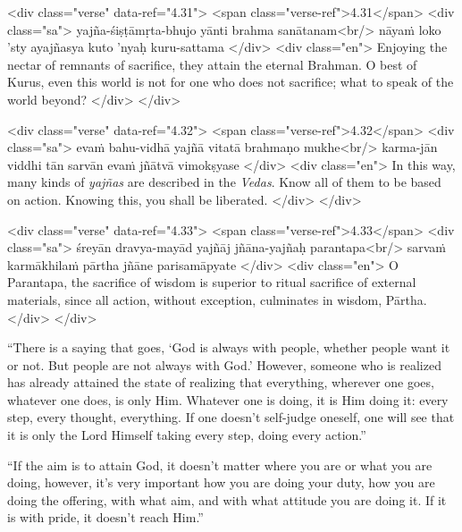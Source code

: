 \begin{html}
<div class="verse" data-ref="4.31">
  <span class="verse-ref">4.31</span>
  <div class="sa">
    yajña-śiṣṭāmṛta-bhujo yānti brahma sanātanam<br/>
    nāyaṁ loko ’sty ayajñasya kuto ’nyaḥ kuru-sattama
  </div>
  <div class="en">
    Enjoying the nectar of remnants of sacrifice, they attain the eternal Brahman. O best of Kurus, even this world is not for one who does not sacrifice; what to speak of the world beyond?
  </div>
</div>
\end{html}



\begin{html}
<div class="verse" data-ref="4.32">
  <span class="verse-ref">4.32</span>
  <div class="sa">
    evaṁ bahu-vidhā yajñā vitatā brahmaṇo mukhe<br/>
    karma-jān viddhi tān sarvān evaṁ jñātvā vimokṣyase
  </div>
  <div class="en">
    In this way, many kinds of \textit{yajñas} are described in the \textit{Vedas}. Know all of them to be based on action. Knowing this, you shall be liberated.
  </div>
</div>
\end{html}



\begin{html}
<div class="verse" data-ref="4.33">
  <span class="verse-ref">4.33</span>
  <div class="sa">
    śreyān dravya-mayād yajñāj jñāna-yajñaḥ parantapa<br/>
    sarvaṁ karmākhilaṁ pārtha jñāne parisamāpyate
  </div>
  <div class="en">
    O Parantapa, the sacrifice of wisdom is superior to ritual sacrifice of external materials, since all action, without exception, culminates in wisdom, Pārtha.
  </div>
</div>
\end{html}


\enquote{There is a saying that goes, \enquote{God is always with people, whether people want it or not. But people are not always with God.} However, someone who is realized has already attained the state of realizing that everything, wherever one goes, whatever one does, is only Him. Whatever one is doing, it is Him doing it: every step, every thought, everything. If one doesn’t self-judge oneself, one will see that it is only the Lord Himself taking every step, doing every action.}

\enquote{If the aim is to attain God, it doesn’t matter where you are or what you are doing, however, it’s very important how you are doing your duty, how you are doing the offering, with what aim, and with what attitude you are doing it. If it is with pride, it doesn’t reach Him.}

